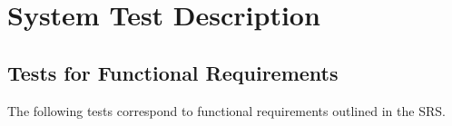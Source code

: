 \documentclass[12pt, titlepage]{article}
\begin{document}
	\section{System Test Description}
	
	\subsection{Tests for Functional Requirements}
	
	

	The following tests correspond to functional requirements outlined in the SRS.
	
	
\end{document}

